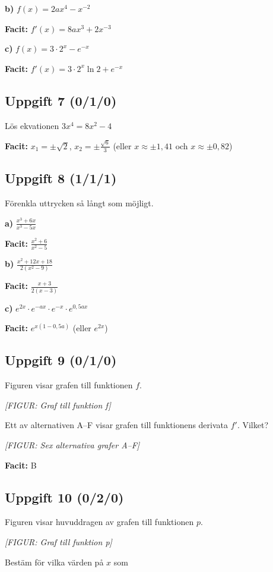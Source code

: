 \documentclass{article}
\begin{document}
\textbf{b)} $f(x) = 2ax^4 - x^{-2}$

\textbf{Facit:} $f'(x) = 8ax^3 + 2x^{-3}$

\textbf{c)} $f(x) = 3 \cdot 2^x - e^{-x}$

\textbf{Facit:} $f'(x) = 3 \cdot 2^x \ln 2 + e^{-x}$

\subsection*{Uppgift 7 (0/1/0)}
Lös ekvationen $3x^4 = 8x^2 - 4$

\textbf{Facit:} $x_1 = \pm\sqrt{2}$, $x_2 = \pm\frac{\sqrt{6}}{3}$ (eller $x \approx \pm 1,41$ och $x \approx \pm 0,82$)

\subsection*{Uppgift 8 (1/1/1)}
Förenkla uttrycken så långt som möjligt.

\textbf{a)} $\frac{x^3 + 6x}{x^3 - 5x}$

\textbf{Facit:} $\frac{x^2 + 6}{x^2 - 5}$

\textbf{b)} $\frac{x^2 + 12x + 18}{2(x^2 - 9)}$

\textbf{Facit:} $\frac{x + 3}{2(x - 3)}$

\textbf{c)} $e^{2x} \cdot e^{-ax} \cdot e^{-x} \cdot e^{0,5ax}$

\textbf{Facit:} $e^{x(1-0,5a)}$ (eller $e^{2x}$)

\subsection*{Uppgift 9 (0/1/0)}
Figuren visar grafen till funktionen $f$.

\textit{[FIGUR: Graf till funktion f]}

Ett av alternativen A--F visar grafen till funktionens derivata $f'$. Vilket?

\textit{[FIGUR: Sex alternativa grafer A--F]}

\textbf{Facit:} B

\subsection*{Uppgift 10 (0/2/0)}
Figuren visar huvuddragen av grafen till funktionen $p$.

\textit{[FIGUR: Graf till funktion p]}

Bestäm för vilka värden på $x$ som
\end{document}
